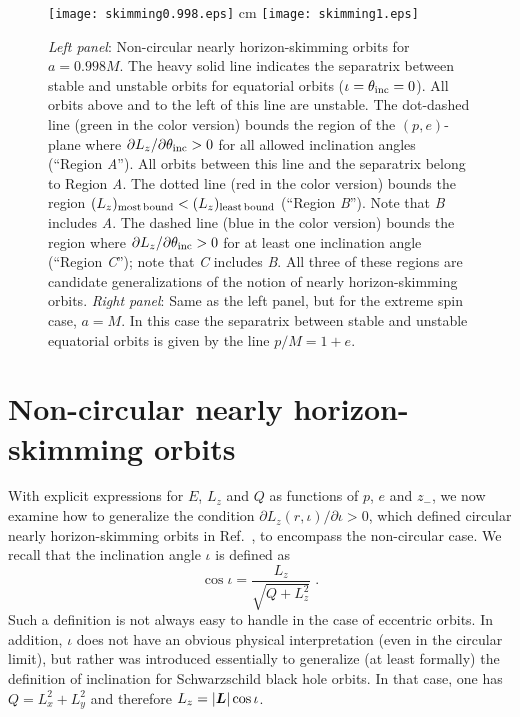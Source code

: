 \documentclass[aps,prd,twocolumn,showpacs,groupedaddress,nofootinbib]{revtex4}
\newcommand{\eq}{\begin{equation}}
\newcommand{\eeq}{\end{equation}}
\begin{document}
\begin{figure*}
\texttt{[image: skimming0.998.eps]}
 cm
\texttt{[image: skimming1.eps]}
\caption{\textit{Left panel}: Non-circular nearly horizon-skimming
  orbits for $a = 0.998M$.  The heavy solid line indicates the
  separatrix between stable and unstable orbits for equatorial orbits
  ($\iota = \theta_{\rm inc} = 0$).  All orbits above and to the left
  of this line are unstable.  The dot-dashed line (green in the color
  version) bounds the region of the $(p,e)$-plane where $\partial
  L_z/\partial\theta_{\rm inc} > 0$ for all allowed inclination angles
  (``Region \textit{A}'').  All orbits between this line and the
  separatrix belong to Region \textit{A}.  The dotted line (red in the
  color version) bounds the region $(L_z)_{\rm most\,bound}<(L_z)_{\rm
  least\,bound}$ (``Region \textit{B}'').  Note that \textit{B}
  includes \textit{A}.  The dashed line (blue in the color version)
  bounds the region where ${\partial L_z}/{\partial \theta_{\rm
  inc}}>0$ for at least one inclination angle (``Region \textit{C}'');
  note that \textit{C} includes \textit{B}.  All three of these
  regions are candidate generalizations of the notion of nearly
  horizon-skimming orbits.  \textit{Right panel}: Same as the left
  panel, but for the extreme spin case, $a = M$.  In this case the
  separatrix between stable and unstable equatorial orbits is given by
  the line $p/M=1+e$.}
\label{fig:regions}
\end{figure*}

\section{\label{sec:skimming} Non-circular nearly horizon-skimming orbits}


With explicit expressions for $E$, $L_z$ and $Q$ as functions of $p$,
$e$ and $z_{-}$, we now examine how to generalize the condition
$\partial L_z(r,\iota)/\partial\iota>0$, which defined circular nearly
horizon-skimming orbits in Ref.~\cite{skimming}, to encompass the
non-circular case. We recall that the inclination angle $\iota$ is
defined as~\cite{skimming}
\eq
\label{iota_def}
\cos\iota=\frac{L_z}{\sqrt{Q+{L^2_z}}}\;.
\eeq
Such a definition is not always easy to handle in the case of
eccentric orbits. In addition, $\iota$ does not have an obvious
physical interpretation (even in the circular limit), but rather was
introduced essentially to generalize (at least formally) the
definition of inclination for Schwarzschild black hole orbits.  In
that case, one has $Q={L^2_x}+{L^2_y}$ and therefore $L_z =
|\mbox{\boldmath$L$}|\cos\iota$.
\end{document}
